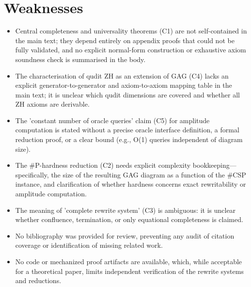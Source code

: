 \documentclass[11pt]{article}
\begin{document}
\section*{Weaknesses}
\begin{itemize}[leftmargin=*]
  \item Central completeness and universality theorems (C1) are not self-contained in the main text; they depend entirely on appendix proofs that could not be fully validated, and no explicit normal-form construction or exhaustive axiom soundness check is summarised in the body.
  \item The characterisation of qudit ZH as an extension of GAG (C4) lacks an explicit generator-to-generator and axiom-to-axiom mapping table in the main text; it is unclear which qudit dimensions are covered and whether all ZH axioms are derivable.
  \item The 'constant number of oracle queries' claim (C5) for amplitude computation is stated without a precise oracle interface definition, a formal reduction proof, or a clear bound (e.g., O(1) queries independent of diagram size).
  \item The \#P-hardness reduction (C2) needs explicit complexity bookkeeping—specifically, the size of the resulting GAG diagram as a function of the \#CSP instance, and clarification of whether hardness concerns exact rewritability or amplitude computation.
  \item The meaning of 'complete rewrite system' (C3) is ambiguous: it is unclear whether confluence, termination, or only equational completeness is claimed.
  \item No bibliography was provided for review, preventing any audit of citation coverage or identification of missing related work.
  \item No code or mechanized proof artifacts are available, which, while acceptable for a theoretical paper, limits independent verification of the rewrite systems and reductions.
\end{itemize}
\end{document}
